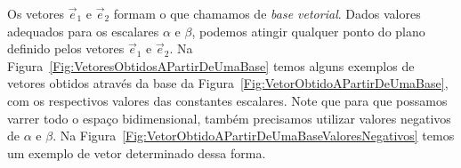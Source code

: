 Os vetores $\vec{e}_1$ e $\vec{e}_2$ formam o que chamamos de \emph{base vetorial}. Dados valores adequados para os escalares $\alpha$ e $\beta$, podemos atingir qualquer ponto do plano definido pelos vetores $\vec{e}_1$ e $\vec{e}_2$. Na Figura~\ref{Fig:VetoresObtidosAPartirDeUmaBase} temos alguns exemplos de vetores obtidos através da base da Figura~\ref{Fig:VetorObtidoAPartirDeUmaBase}, com os respectivos valores das constantes escalares. Note que para que possamos varrer todo o espaço bidimensional, também precisamos utilizar valores negativos de $\alpha$ e $\beta$. Na Figura~\ref{Fig:VetorObtidoAPartirDeUmaBaseValoresNegativos} temos um exemplo de vetor determinado dessa forma.


